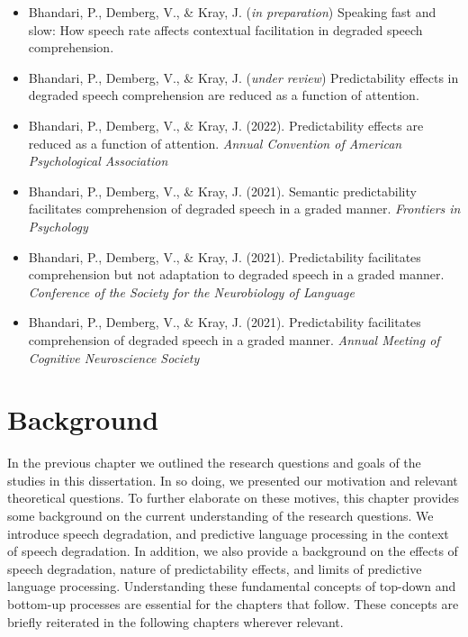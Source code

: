 \documentclass[a4paper, nobind]{templates/ociamthesis}
\providecommand{\tightlist}{%
  \setlength{\itemsep}{0pt}\setlength{\parskip}{0pt}}
\begin{document}
\begin{itemize}
\item
  Bhandari, P., Demberg, V., \& Kray, J. (\emph{in preparation}) Speaking fast and slow: How speech rate affects contextual facilitation in degraded speech comprehension.
\item
  Bhandari, P., Demberg, V., \& Kray, J. (\emph{under review}) Predictability effects in degraded speech comprehension are reduced as a function of attention.
\item
  Bhandari, P., Demberg, V., \& Kray, J. (2022). Predictability effects are reduced as a function of attention. \emph{Annual Convention of American Psychological Association}
\item
  Bhandari, P., Demberg, V., \& Kray, J. (2021). Semantic predictability facilitates comprehension of degraded speech in a graded manner. \emph{Frontiers in Psychology}
\item
  Bhandari, P., Demberg, V., \& Kray, J. (2021). Predictability facilitates comprehension but not adaptation to degraded speech in a graded manner. \emph{Conference of the Society for the Neurobiology of Language}
\end{itemize}

\begin{itemize}
\tightlist
\item
  Bhandari, P., Demberg, V., \& Kray, J. (2021). Predictability facilitates comprehension of degraded speech in a graded manner. \emph{Annual Meeting of Cognitive Neuroscience Society}
\end{itemize}

\hypertarget{background}{%
\chapter{Background}\label{background}}

In the previous chapter we outlined the research questions and goals of the studies in this dissertation.
In so doing, we presented our motivation and relevant theoretical questions.
To further elaborate on these motives, this chapter provides some background on the current understanding of the research questions.
We introduce speech degradation, and predictive language processing in the context of speech degradation.
In addition, we also provide a background on the effects of speech degradation, nature of predictability effects, and limits of predictive language processing.
Understanding these fundamental concepts of top-down and bottom-up processes are essential for the chapters that follow.
These concepts are briefly reiterated in the following chapters wherever relevant.
\end{document}
